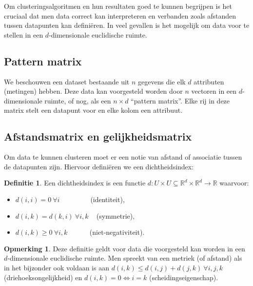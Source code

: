 \documentclass[a4paper,12pt]{article}
\theoremstyle{definition}
\newtheorem{definition}{Definitie}[subsection]
\newtheorem{opm}{Opmerking}[subsection]
\begin{document}
Om clusteringsalgoritmen en hun resultaten goed te kunnen begrijpen is het cruciaal
dat men data correct kan interpreteren en verbanden zoals afstanden tussen
datapunten kan definiëren. In veel gevallen is het mogelijk om data voor te stellen
in een $d$-dimensionale euclidische ruimte.

\subsection{Pattern matrix}
We beschouwen een dataset bestaande uit $n$ gegevens die elk $d$ attributen (metingen)
hebben. Deze data kan voorgesteld worden door $n$ vectoren in een $d$-dimensionale 
ruimte, of nog, als een $n \times d$ ``pattern matrix''. Elke rij in deze matrix
stelt een datapunt voor en elke kolom een attribuut.



\subsection{Afstandsmatrix en gelijkheidsmatrix}
\label{sec_proxmat}
Om data te kunnen clusteren moet er een notie van afstand of associatie tussen
de datapunten zijn. Hiervoor definiëren we een dichtheidsindex:

\begin{definition}
 Een dichtheidsindex is een functie
 $d: U \times U \subseteq \mathbb{R}^d \times \mathbb{R}^d \rightarrow \mathbb{R}$
 waarvoor:
 \begin{itemize}
  \item $d(i,i) = 0\  \forall i \hspace{50pt}$ (identiteit),
  \item $d(i,k) = d(k,i)\  \forall i,k \hspace{10pt}$ (symmetrie),
  \item $d(i,k) \geq 0\  \forall i,k \hspace{35pt}$ (niet-negativiteit).
 \end{itemize}
\end{definition}

\begin{opm}
 Deze definitie geldt voor data die voorgesteld kan worden in een $d$-dimensio\-nale
 euclidische ruimte. Men spreekt van een metriek (of afstand) als in het 
 bijzonder ook voldaan is aan $d(i,k) \leq d(i,j) + d(j,k)\ \forall i,j,k$ (driehoeksongelijkheid) 
 en $d(i,k) = 0 \Leftrightarrow i = k$ (scheidingseigenschap).
\end{opm}
\end{document}
